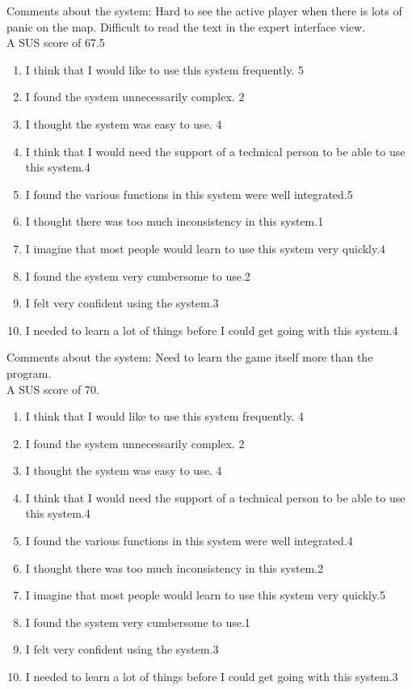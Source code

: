 Comments about the system: Hard to see the active player when there is lots of panic on the map. Difficult to read the text in the expert interface view.\\
A SUS score of 67.5\\

\begin{enumerate} \setlength{\itemsep}{0cm}\setlength{\parskip}{0cm}
	\item I think that I would like to use this system frequently. \hfill 5 
	\item I found the system unnecessarily complex. \hfill 2
	\item I thought the system was easy to use. \hfill 4
	\item I think that I would need the support of a technical person to be able to use this system.\hfill 4
	\item I found the various functions in this system were well integrated.\hfill 5
	\item I thought there was too much inconsistency in this system.\hfill 1
	\item I imagine that most people would learn to use this system very quickly.\hfill 4
	\item I found the system very cumbersome to use.\hfill 2
	\item I felt very confident using the system.\hfill 3
	\item I needed to learn a lot of things before I could get going with this system.\hfill 4
\end{enumerate}

Comments about the system: Need to learn the game itself more than the program.\\

A SUS score of 70.\\

\begin{enumerate} \setlength{\itemsep}{0cm}\setlength{\parskip}{0cm}
	\item I think that I would like to use this system frequently. \hfill 4
	\item I found the system unnecessarily complex. \hfill 2
	\item I thought the system was easy to use. \hfill 4
	\item I think that I would need the support of a technical person to be able to use this system.\hfill 4
	\item I found the various functions in this system were well integrated.\hfill 4
	\item I thought there was too much inconsistency in this system.\hfill 2
	\item I imagine that most people would learn to use this system very quickly.\hfill 5
	\item I found the system very cumbersome to use.\hfill 1
	\item I felt very confident using the system.\hfill 3
	\item I needed to learn a lot of things before I could get going with this system.\hfill 3
\end{enumerate}


